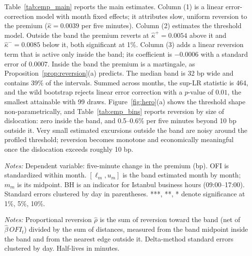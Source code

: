 \documentclass[12pt]{article}
\theoremstyle{definition}
\theoremstyle{remark}
\begin{document}
Table~\ref{tab:emp_main} reports the main estimates. Column (1) is a linear error-correction model with month fixed effects; it attributes slow, uniform reversion to the premium ($\hat\kappa=0.0039$ per five minutes). Column (2) estimates the threshold model. Outside the band the premium reverts at $\hat\kappa^+=0.0054$ above it and $\hat\kappa^-=0.0085$ below it, both significant at 1\%. Column (3) adds a linear reversion term that is active only inside the band; its coefficient is $-0.0006$ with a standard error of $0.0007$. Inside the band the premium is a martingale, as Proposition~\ref{prop:reversion}(a) predicts. The median band is 32 bp wide and contains 39\% of the intervals. Summed across months, the sup-LR statistic is 464, and the wild bootstrap rejects linear error correction with a $p$-value of $0.01$, the smallest attainable with 99 draws. Figure~\ref{fig:hero}(a) shows the threshold shape non-parametrically, and Table~\ref{tab:emp_bins} reports reversion by size of dislocation: zero inside the band, and 0.5--0.6\% per five minutes beyond 10 bp outside it. Very small estimated excursions outside the band are noisy around the profiled threshold; reversion becomes monotone and economically meaningful once the dislocation exceeds roughly 10 bp.

\begin{table}[t]
\centering
\caption{\textbf{Threshold arbitrage in the USDT/TRY premium}}
\label{tab:emp_main}
\footnotesize
\resizebox{\ifdim\width>\textwidth\textwidth\else\width\fi}{!}{}
\begin{minipage}{0.95\textwidth}
\footnotesize\vspace{4pt}
\emph{Notes:} Dependent variable: five-minute change in the premium (bp). OFI is standardized within month. $[\ell_m,u_m]$ is the band estimated month by month; $m_m$ is its midpoint. BH is an indicator for Istanbul business hours (09:00--17:00). Standard errors clustered by day in parentheses. ***, **, * denote significance at 1\%, 5\%, 10\%.
\end{minipage}
\end{table}


\begin{table}[t]
\centering
\caption{\textbf{Reversion by size of dislocation}}
\label{tab:emp_bins}
\footnotesize
\resizebox{\ifdim\width>\textwidth\textwidth\else\width\fi}{!}{}
\begin{minipage}{0.95\textwidth}
\footnotesize\vspace{4pt}
\emph{Notes:} Proportional reversion $\hat\rho$ is the sum of reversion toward the band (net of $\hat\beta\,\mathit{OFI}_t$) divided by the sum of distances, measured from the band midpoint inside the band and from the nearest edge outside it. Delta-method standard errors clustered by day. Half-lives in minutes.
\end{minipage}
\end{table}
\end{document}
